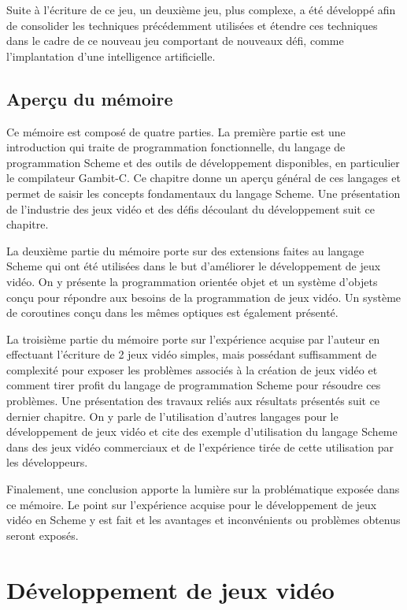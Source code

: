 \documentclass[12pt,oneside,letterpaper,francais]{book}
\begin{document}
Suite à l'écriture de ce jeu, un deuxième jeu, plus complexe, a été
développé afin de consolider les techniques précédemment utilisées et
étendre ces techniques dans le cadre de ce nouveau jeu comportant de
nouveaux défi, comme l'implantation d'une intelligence artificielle.



\section{Aperçu du mémoire}
Ce mémoire est composé de quatre parties. La première partie est une
introduction qui traite de programmation fonctionnelle, du langage de
programmation Scheme et des outils de développement disponibles, en
particulier le compilateur Gambit-C. Ce chapitre donne un aperçu
général de ces langages et permet de saisir les concepts fondamentaux
du langage Scheme. Une présentation de l'industrie des jeux vidéo et
des défis découlant du développement suit ce chapitre.

La deuxième partie du mémoire porte sur des extensions faites au
langage Scheme qui ont été utilisées dans le but d'améliorer le
développement de jeux vidéo. On y présente la programmation orientée
objet et un système d'objets conçu pour répondre aux besoins de la
programmation de jeux vidéo. Un système de coroutines conçu dans les
mêmes optiques est également présenté.

La troisième partie du mémoire porte sur l'expérience acquise par
l'auteur en effectuant l'écriture de 2 jeux vidéo simples, mais
possédant suffisamment de complexité pour exposer les problèmes
associés à la création de jeux vidéo et comment tirer profit du
langage de programmation Scheme pour résoudre ces problèmes. Une
présentation des travaux reliés aux résultats présentés suit ce
dernier chapitre. On y parle de l'utilisation d'autres langages
pour le développement de jeux vidéo et cite des exemple d'utilisation
du langage Scheme dans des jeux vidéo commerciaux et de l'expérience
tirée de cette utilisation par les développeurs.

Finalement, une conclusion apporte la lumière sur la problématique
exposée dans ce mémoire. Le point sur l'expérience acquise pour le
développement de jeux vidéo en Scheme y est fait et les avantages et
inconvénients ou problèmes obtenus seront exposés.




\chapter{Développement de jeux vidéo}
\label{Chap:JV}
\end{document}
